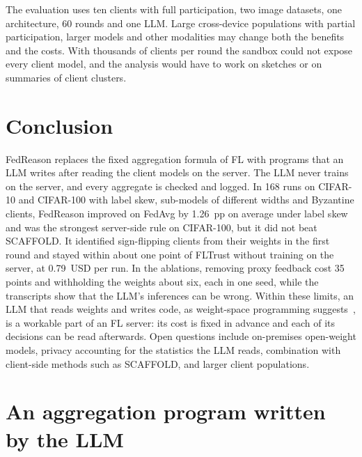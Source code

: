 \documentclass[3p,times,a4paper]{elsarticle}
\begin{document}
The evaluation uses ten clients with full participation, two image datasets, one architecture, 60 rounds and one LLM. Large cross-device populations with partial participation, larger models and other modalities may change both the benefits and the costs. With thousands of clients per round the sandbox could not expose every client model, and the analysis would have to work on sketches or on summaries of client clusters.

\section{Conclusion}
\label{sec:conclusion}

FedReason replaces the fixed aggregation formula of FL with programs that an LLM writes after reading the client models on the server. The LLM never trains on the server, and every aggregate is checked and logged. In 168 runs on CIFAR-10 and CIFAR-100 with label skew, sub-models of different widths and Byzantine clients, FedReason improved on FedAvg by 1.26~pp on average under label skew and was the strongest server-side rule on CIFAR-100, but it did not beat SCAFFOLD. It identified sign-flipping clients from their weights in the first round and stayed within about one point of FLTrust without training on the server, at 0.79~USD per run. In the ablations, removing proxy feedback cost 35 points and withholding the weights about six, each in one seed, while the transcripts show that the LLM's inferences can be wrong. Within these limits, an LLM that reads weights and writes code, as weight-space programming suggests~\cite{takehi2026sparks}, is a workable part of an FL server: its cost is fixed in advance and each of its decisions can be read afterwards. Open questions include on-premises open-weight models, privacy accounting for the statistics the LLM reads, combination with client-side methods such as SCAFFOLD, and larger client populations.

\appendix

\section{An aggregation program written by the LLM}
\label{app:program}
\end{document}
